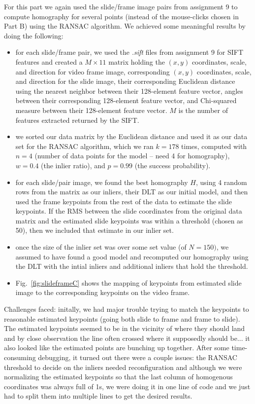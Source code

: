 For this part we again used the slide/frame image pairs from assignment 9 to compute homography for several points (instead of the mouse-clicks chosen in Part B) using the RANSAC algorithm. We achieved some meaningful results by doing the following: 

\begin{itemize}
	\item for each slide/frame pair, we used the {\it .sift} files from assignment 9 for SIFT features and created a $M \times 11$ matrix holding the $(x, y)$ coordinates, scale, and direction for video frame image, corresponding $(x, y)$ coordinates, scale, and direction for the slide image, their corresponding Euclidean distance using the nearest neighbor between their 128-element feature vector, angles between their corresponding 128-element feature vector, and Chi-squared measure between their 128-element feature vector. $M$ is the number of features extracted returned by the SIFT. 
	\item we sorted our data matrix by the Euclidean distance and used it as our data set for the RANSAC algorithm, which we ran $k = 178$ times, computed with $n=4$ (number of data points for the model -- need 4 for homography), $w = 0.4$ (the inlier ratio), and $p=0.99$ (the success probability).
	\item for each slide/pair image, we found the best homography $H$, using 4 random rows from the matrix as our inliers, their DLT as our initial model, and then used the frame keypoints from the rest of the data to estimate the slide keypoints. If the RMS between the slide coordinates from the original data matrix and the estimated slide keypoints was within a threshold (chosen as 50), then we included that estimate in our inlier set. 
	\item once the size of the inlier set was over some set value (of $N=150)$, we assumed to have found a good model and recomputed our homography using the DLT with the intial inliers and additional inliers that hold the threshold. 
	\item Fig.~\ref{fig:slideframeC} shows the mapping of keypoints from estimated slide image to the corresponding keypoints on the video frame.  
\end{itemize}

Challenges faced: initally, we had major trouble trying to match the keypoints to reasonable estimated keypoints (going both slide to frame and frame to slide). The estimated keypoints seemed to be in the vicinity of where they should land and by close observation the line often crossed where it supposedly should be... it also looked like the estimated points are bunching up together. After some time-consuming debugging, it turned out there were a couple issues: the RANSAC threshold to decide on the inliers needed reconfiguration and although we were normalizing the estimated keypoints so that the last column of homogenous coordinates was always full of 1s, we were doing it in one line of code and we just had to split them into multiple lines to get the desired results. 

